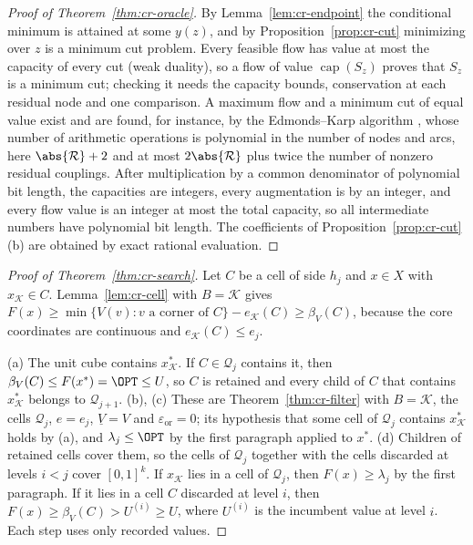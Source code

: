 \begin{proof}[Proof of Theorem~\ref{thm:cr-oracle}]
By Lemma~\ref{lem:cr-endpoint} the conditional minimum is attained at some
$y(z)$, and by Proposition~\ref{prop:cr-cut} minimizing over $z$ is a
minimum cut problem. Every feasible flow has value at most the capacity of
every cut (weak duality), so a flow of value $\operatorname{cap}(S_z)$
proves that $S_z$ is a minimum cut; checking it needs the capacity bounds,
conservation at each residual node and one comparison. A maximum flow and a
minimum cut of equal value exist and are found, for instance, by the
Edmonds--Karp algorithm \cite{EdmondsKarp1972}, whose number of arithmetic
operations is polynomial in the number of nodes and arcs, here
$\abs{\mathcal R}+2$ and at most $2\abs{\mathcal R}$ plus twice the number
of nonzero residual couplings. After multiplication by a common denominator
of polynomial bit length, the capacities are integers, every augmentation is
by an integer, and every flow value is an integer at most the total
capacity, so all intermediate numbers have polynomial bit length. The
coefficients of Proposition~\ref{prop:cr-cut}(b) are obtained by exact
rational evaluation.
\end{proof}

\begin{proof}[Proof of Theorem~\ref{thm:cr-search}]
Let $C$ be a cell of side $h_j$ and $x\in X$ with $x_{\mathcal K}\in C$.
Lemma~\ref{lem:cr-cell} with $B=\mathcal K$ gives
$F(x)\ge\min\{V(v):v\text{ a corner of }C\}-e_{\mathcal K}(C)\ge\beta_V(C)$,
because the core coordinates are continuous and $e_{\mathcal K}(C)\le e_j$.

(a) The unit cube contains $x^*_{\mathcal K}$. If $C\in\mathcal Q_j$ contains
it, then $\beta_V(C)\le F(x^*)=\OPT\le U$, so $C$ is retained and every
child of $C$ that contains $x^*_{\mathcal K}$ belongs to $\mathcal Q_{j+1}$.
(b), (c) These are Theorem~\ref{thm:cr-filter} with $B=\mathcal K$, the
cells $\mathcal Q_j$, $e=e_j$, $\underline V=V$ and $\varepsilon_{\mathrm{or}}=0$; its hypothesis
that some cell of $\mathcal Q_j$ contains $x^*_{\mathcal K}$ holds by (a), and
$\lambda_j\le\OPT$ by the first paragraph applied to $x^*$.
(d) Children of retained cells cover them, so the cells of $\mathcal Q_j$
together with the cells discarded at levels $i<j$ cover $[0,1]^k$. If
$x_{\mathcal K}$ lies in a cell of $\mathcal Q_j$, then $F(x)\ge\lambda_j$ by
the first paragraph. If it lies in a cell $C$ discarded at level $i$, then
$F(x)\ge\beta_V(C)>U^{(i)}\ge U$, where $U^{(i)}$ is the incumbent value at
level $i$. Each step uses only recorded values.
\end{proof}

